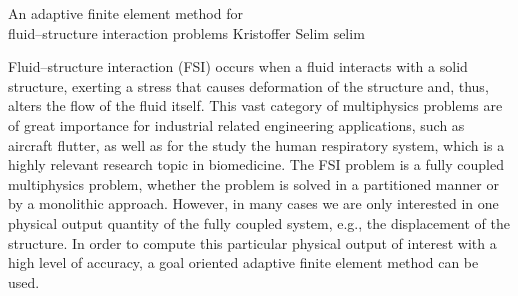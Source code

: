                {An adaptive finite element method for \\fluid--structure interaction problems}
               {Kristoffer Selim}
               {selim}
\newcommand{\subdt}{\textrm{d}_t}
\newcommand{\divv}{\textrm{div}\;}
\newcommand{\Divv}{\textrm{Div}\;}
\newcommand{\uF}{u_{_{F}}}
\newcommand{\dotuF}{\dot{u}_{_{F}}}
\newcommand{\pF}{p_{_{F}}}
\newcommand{\rhoF}{\rho_{_{F}}}
\newcommand{\sigmaF}{\sigma_{_{F}}}
\newcommand{\sigmaFup}{\sigma_{_{F}}(u_{_{F}}, p_{_{F}})}
\newcommand{\sigmaS}{\sigma_{_{S}}}
\newcommand{\bff}{b_{_{F}}}
\newcommand{\graduF}{\textrm{grad}\;u_{_{F}}}
\newcommand{\US}{U_{_{S}}}
\newcommand{\uS}{u_{_{S}}}
\newcommand{\GradUS}{\textrm{Grad}\;U_{_{S}}}
\newcommand{\ddotUS}{\ddot{U}_{_{S}}}
\newcommand{\ddotuS}{\ddot{u}_{_{S}}}
\newcommand{\PS}{P_{_{S}}}
\newcommand{\rhoS}{\rho_{_{S}}}
\newcommand{\SigmaS}{\Sigma_{_{S}}}
\newcommand{\SigmaSU}{\Sigma_{_{S}}(U_{_{S}})}
\newcommand{\BS}{B_{_{S}}}
\newcommand{\M}{\mathcal{M}}
\newcommand{\E}{\mathcal{E}}
\newcommand{\oF}{\omega_{_{F}}}
\newcommand{\oS}{\omega_{_{S}}}
\newcommand{\OS}{\Omega_{_{S}}}
\newcommand{\OF}{\Omega_{_{F}}}
\newcommand{\PhiS}{\Phi_{_{S}}}
\newcommand{\PhiM}{\Phi_{_{M}}}
\newcommand{\FS}{F_{_{S}}}
\newcommand{\UM}{U_{_{M}}}
\newcommand{\SigmaM}{\Sigma_{_{M}}}
\newcommand{\GradUM}{\textrm{Grad}\;U_{_{M}}}
\newcommand{\UF}{U_{_{F}}}
\newcommand{\PF}{P_{_{F}}}
\newcommand{\AFF}{A_{_{FF}}}
\newcommand{\AFS}{A_{_{FS}}}
\newcommand{\AFM}{A_{_{FM}}}
\newcommand{\ASS}{A_{_{SS}}}
\newcommand{\ASF}{A_{_{SF}}}
\newcommand{\ASM}{A_{_{SM}}}
\newcommand{\AMM}{A_{_{MM}}}
\newcommand{\AMF}{A_{_{MF}}}
\newcommand{\AMS}{A_{_{MS}}}


Fluid--structure interaction (FSI) occurs when a fluid interacts with
a solid structure, exerting a stress that causes deformation of the
structure and, thus, alters the flow of the fluid itself. This vast
category of multiphysics problems are of great importance for
industrial related engineering applications, such as aircraft flutter,
as well as for the study the human respiratory system, which is a
highly relevant research topic in biomedicine. The FSI problem is a
fully coupled multiphysics problem, whether the problem is solved in a
partitioned manner or by a monolithic approach. However, in
many cases we are only interested in one physical output quantity of
the fully coupled system, e.g., the displacement of the structure. In
order to compute this particular physical output of interest with a
high level of accuracy, a goal oriented adaptive finite element method
can be used.


